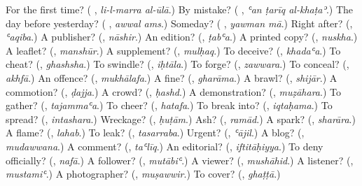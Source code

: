 \begin{tcolorbox}[breakable,colback=teal!4,colframe=teal!35!black,title={Before you move on}]
For the first time? (\textbf{ }, \emph{li-l-marra al-ūlā}.) By mistake? (\textbf{  }, \emph{ʿan ṭarīq al-khaṭaʾ}.) The day before yesterday? (\textbf{ }, \emph{awwal ams}.) Someday? (\textbf{ }, \emph{yawman mā}.) Right after? (\textbf{}, \emph{ʿaqiba}.) A publisher? (\textbf{}, \emph{nāshir}.) An edition? (\textbf{}, \emph{ṭabʿa}.) A printed copy? (\textbf{}, \emph{nuskha}.) A leaflet? (\textbf{}, \emph{manshūr}.) A supplement? (\textbf{}, \emph{mulḥaq}.) To deceive? (\textbf{}, \emph{khadaʿa}.) To cheat? (\textbf{}, \emph{ghashsha}.) To swindle? (\textbf{}, \emph{iḥtāla}.) To forge? (\textbf{}, \emph{zawwara}.) To conceal? (\textbf{}, \emph{akhfā}.) An offence? (\textbf{}, \emph{mukhālafa}.) A fine? (\textbf{}, \emph{gharāma}.) A brawl? (\textbf{}, \emph{shijār}.) A commotion? (\textbf{}, \emph{ḍajja}.) A crowd? (\textbf{}, \emph{ḥashd}.) A demonstration? (\textbf{}, \emph{muẓāhara}.) To gather? (\textbf{}, \emph{tajammaʿa}.) To cheer? (\textbf{}, \emph{hatafa}.) To break into? (\textbf{}, \emph{iqtaḥama}.) To spread? (\textbf{}, \emph{intashara}.) Wreckage? (\textbf{}, \emph{ḥuṭām}.) Ash? (\textbf{}, \emph{ramād}.) A spark? (\textbf{}, \emph{sharāra}.) A flame? (\textbf{}, \emph{lahab}.) To leak? (\textbf{}, \emph{tasarraba}.) Urgent? (\textbf{}, \emph{ʿājil}.) A blog? (\textbf{}, \emph{mudawwana}.) A comment? (\textbf{}, \emph{taʿlīq}.) An editorial? (\textbf{}, \emph{iftitāḥiyya}.) To deny officially? (\textbf{}, \emph{nafā}.) A follower? (\textbf{}, \emph{mutābiʿ}.) A viewer? (\textbf{}, \emph{mushāhid}.) A listener? (\textbf{}, \emph{mustamiʿ}.) A photographer? (\textbf{}, \emph{muṣawwir}.) To cover? (\textbf{}, \emph{ghaṭṭā}.)
\end{tcolorbox}
